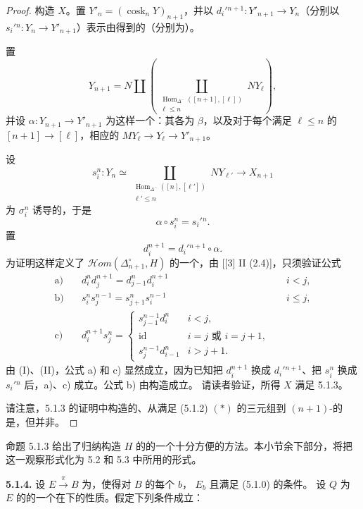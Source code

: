 \begin{proof}
构造 $X$。置 $Y'_n=(\operatorname{cosk}_nY)_{n+1}$，并以 $d_i'{}^{n+1}:Y'_{n+1}\to Y_n$（分别以 $s_i'{}^n:Y_n\to Y'_{n+1}$）表示由得到的（分别为）。

置
\[
Y_{n+1}=N\amalg\left(\coprod_{\substack{\operatorname{Hom}_{\Delta^-}([n+1],[\ell])\\\ell\leq n}}NY_\ell\right),
\]
并设 $\alpha:Y_{n+1}\to Y'_{n+1}$ 为这样一个：其各为 $\beta$，以及对于每个满足 $\ell\leq n$ 的 $[n+1]\to[\ell]$，相应的 $MY_\ell\to Y_\ell\to Y'_{n+1}$。

设
\[
s_i^n:Y_n\simeq\coprod_{\substack{\operatorname{Hom}_{\Delta^-}([n],[\ell'])\\\ell'\leq n}}NY_{\ell'}\longrightarrow X_{n+1}
\]
为 $\sigma_i^n$ 诱导的，于是
\[
\alpha\circ s_i^n=s_i'{}^n. \tag{I}
\]
置
\[
d_i^{n+1}=d_i'{}^{n+1}\circ\alpha. \tag{II}
\]
为证明这样定义了 $\mathcal{H}om(\Delta_{n+1}^\circ,H)$ 的一个，由 [[3] II (2.4)]，只须验证公式
\[
\begin{aligned}
\text{a)}\quad&d_i^n d_j^{n+1}=d_{j-1}^n d_i^{n+1}&&i<j,\\
\text{b)}\quad&s_i^n s_j^{n-1}=s_{j+1}^n s_i^{n-1}&&i\leq j,\\
\text{c)}\quad&d_i^{n+1}s_j^n=
\begin{cases}
s_{j-1}^{n-1}d_i^n&i<j,\\
\operatorname{id}&i=j\text{ 或 }i=j+1,\\
s_j^{n-1}d_{i-1}^n&i>j+1.
\end{cases}
\end{aligned}
\]
由 (I)、(II)，公式 a) 和 c) 显然成立，因为已知把 $d_i^{n+1}$ 换成 $d_i'{}^{n+1}$、把 $s_i^n$ 换成 $s_i'{}^n$ 后，a)、c) 成立。公式 b) 由构造成立。
请读者验证，所得 $X$ 满足 5.1.3。

请注意，5.1.3 的证明中构造的、从满足 (5.1.2) $(*)$ 的三元组到 $(n+1)$-的是，但并非。
\end{proof}
命题 5.1.3 给出了归纳构造 $H$ 的的一个十分方便的方法。本小节余下部分，将把这一观察形式化为 5.2 和 5.3 中所用的形式。

\textbf{5.1.4.} 设 $E\xrightarrow{\pi}B$ 为，使得对 $B$ 的每个 $b$， $E_b$ 且满足 (5.1.0) 的条件。
设 $Q$ 为 $E$ 的的一个在下的性质。假定下列条件成立：


